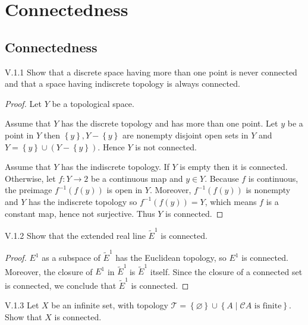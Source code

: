 \chapter{Connectedness}

\section{Connectedness}

\begin{problem}{V.1.1}
Show that a discrete space having more than one point is never connected and that a space having indiscrete topology is always connected.
\end{problem}

\begin{proof}
	Let \( Y \) be a topological space.

	Assume that \( Y \) has the discrete topology and has more than one point. Let \( y \) be a point in \( Y \) then \( \left\{ y \right\}, Y - \left\{ y \right\} \) are nonempty disjoint open sets in \( Y \) and \( Y = \left\{ y \right\} \cup (Y - \left\{ y \right\}) \). Hence \( Y \) is not connected.

	Assume that \( Y \) has the indiscrete topology. If \( Y \) is empty then it is connected. Otherwise, let \( f: Y \to 2 \) be a continuous map and \( y \in Y \). Because \( f \) is continuous, the preimage \( f^{-1}(f(y)) \) is open in \( Y \). Moreover, \( f^{-1}(f(y)) \) is nonempty and \( Y \) has the indiscrete topology so \( f^{-1}(f(y)) = Y \), which means \( f \) is a constant map, hence not surjective. Thus \( Y \) is connected.
\end{proof}

\begin{problem}{V.1.2}
Show that the extended real line \( \tilde{E}^{1} \) is connected.
\end{problem}

\begin{proof}
	\( E^{1} \) as a subspace of \( \tilde{E}^{1} \) has the Euclidean topology, so \( E^{1} \) is connected. Moreover, the closure of \( E^{1} \) in \( \tilde{E}^{1} \) is \( \tilde{E}^{1} \) itself. Since the closure of a connected set is connected, we conclude that \( \tilde{E}^{1} \) is connected.
\end{proof}

\begin{problem}{V.1.3}\label{problem:V.1.3}
Let \( X \) be an infinite set, with topology \( \mathscr{T} = \left\{ \varnothing \right\} \cup \left\{ A \mid \mathscr{C}A \text{ is finite} \right\} \). Show that \( X \) is connected.
\end{problem}

